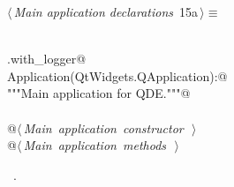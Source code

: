 \documentclass[
    a4paper,      %
    10pt,         %
    openright,    %
    notitlepage,  %
    parskip=half, %
]{scrreprt}       %
\theoremstyle{definition}                    %
\begin{document}
\begin{flushleft} \small
\begin{minipage}{\linewidth}\label{scrap2}\raggedright\small
{} $\langle\,${\itshape Main application declarations}\nobreak\ {\footnotesize {15a}}$\,\rangle\equiv$
\vspace{-1exm}
\begin{list}{}{} \item
\mbox{}\lstinline@@\\
\mbox{}\lstinline@common.with_logger@\\
\mbox{}\lstinline@class Application(QtWidgets.QApplication):@\\
\mbox{}\lstinline@    """Main application for QDE."""@\\
\mbox{}\lstinline@@\\
\mbox{}\lstinline@    @\hbox{$\langle\,${\itshape Main application constructor}\nobreak\ {\footnotesize {}}$\,\rangle$}\lstinline@@\\
\mbox{}\lstinline@    @\hbox{$\langle\,${\itshape Main application methods}\nobreak\ {\footnotesize {}}$\,\rangle$}\lstinline@@\\
\mbox{}\lstinline@@{\NWsep}
\end{list}
\vspace{-1.5ex}
\footnotesize
\begin{list}{}{\setlength{\itemsep}{-\parsep}\setlength{\itemindent}{-\leftmargin}}
\item \NWtxtMacroRefIn\ .

\item{}
\end{list}
\end{minipage}\vspace{4ex}
\end{flushleft}
\end{document}
